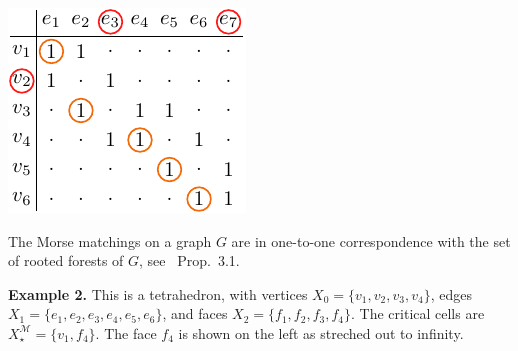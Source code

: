 \documentclass[11pt,oneside]{article}
\newcommand{\MM}{\mathcal{M}}
\begin{document}
\begin{center}
\includegraphics[]{images/pic-matrix-graph}
\end{center}

The Morse matchings on a graph $G$ are in one-to-one
correspondence with the set of rooted forests of $G$,
see~\cite{Chari2005} Prop.~3.1.



\noindent
{\bf Example 2.}
This is a tetrahedron, with vertices $X_0=\{v_1,v_2,v_3,v_4\}$,
edges 
$X_1=\{e_1,e_2,e_3,e_4,e_5,e_6\}$,
and faces 
$X_2=\{f_1,f_2,f_3,f_4\}.$
The critical cells are $X_{\star}^\MM = \{ v_1, f_4 \}.$
The face $f_4$ is shown on the left as streched out to infinity.
\end{document}
